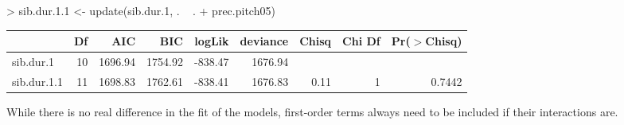 \documentclass[a4paper]{article}
\begin{document}
\begin{Schunk}
\begin{Sinput}
> sib.dur.1.1 <- update(sib.dur.1, . ~ . + prec.pitch05)
\end{Sinput}
\end{Schunk}
\begin{table}[h!]
\centering
\begin{tabular}{lrrrrrrrr}
  \hline
 & Df & AIC & BIC & logLik & deviance & Chisq & Chi Df & Pr($>$Chisq) \\
  \hline
sib.dur.1 & 10 & 1696.94 & 1754.92 & -838.47 & 1676.94 &  &  &  \\
  sib.dur.1.1 & 11 & 1698.83 & 1762.61 & -838.41 & 1676.83 & 0.11 & 1 & 0.7442 \\
   \hline
\end{tabular}
\end{table}
While there is no real difference in the fit of the models,
first-order terms always need to be included if their interactions are.\newline
\end{document}
